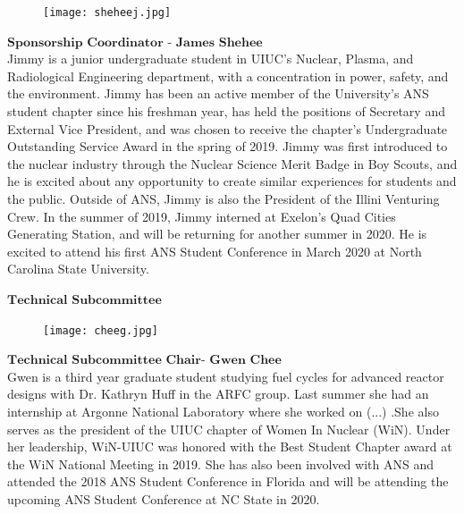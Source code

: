 \setlength\intextsep{0pt}
\begin{figure}
	\begin{center}
		\vspace{-\baselineskip}
		\texttt{[image: sheheej.jpg]}
	\end{center}
\end{figure}
$\textbf{Sponsorship Coordinator - James Shehee}$\\
Jimmy is a junior undergraduate student in UIUC's Nuclear, Plasma, and Radiological Engineering department, with a concentration in power, safety, and the environment. Jimmy has been an active member of the University's ANS student chapter since his freshman year, has held the positions of Secretary and External Vice President, and was chosen to receive the chapter's Undergraduate Outstanding Service Award in the spring of 2019. Jimmy was first introduced to the nuclear industry through the Nuclear Science Merit Badge in Boy Scouts, and he is excited about any opportunity to create similar experiences for students and the public. Outside of ANS, Jimmy is also the President of the Illini Venturing Crew. In the summer of 2019, Jimmy interned at Exelon's Quad Cities Generating Station, and will be returning for another summer in 2020. He is excited to attend his first ANS Student Conference in March 2020 at North Carolina State University.

$\textbf{Technical Subcommittee}$\\
\setlength\intextsep{0pt}
\begin{figure}
	\begin{center}
		\vspace{-\baselineskip}
		\texttt{[image: cheeg.jpg]}
	\end{center}
\end{figure}
$\textbf{Technical Subcommittee Chair- Gwen Chee}$\\
Gwen is a third year graduate student studying fuel cycles for advanced reactor designs with Dr. Kathryn Huff in the ARFC group. Last summer she had an internship at Argonne National Laboratory where she worked on (...) .She also serves as the president of the UIUC chapter of Women In Nuclear (WiN). Under her leadership, WiN-UIUC was honored with the Best Student Chapter award at the WiN National Meeting in 2019. She has also been involved with ANS and attended the 2018 ANS Student Conference in Florida and will be attending the upcoming ANS Student Conference at NC State in 2020. 

